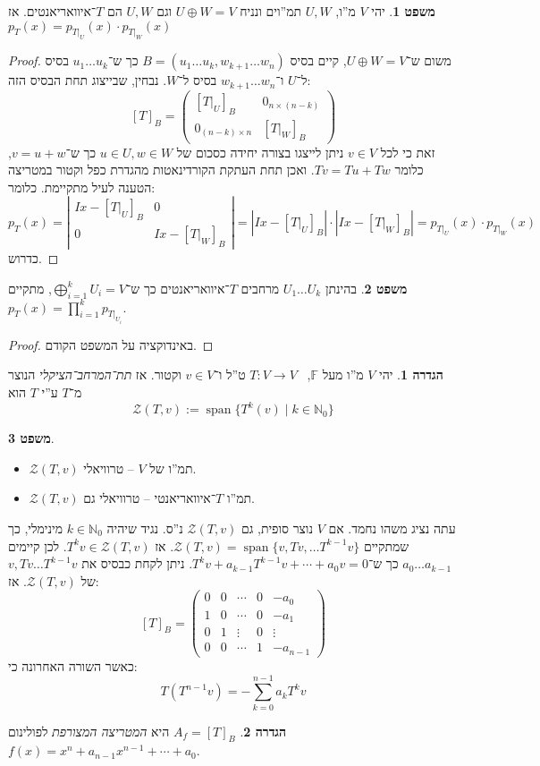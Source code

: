 \documentclass[a4paper]{article}
\newcommand\N     {\mathbb{N}}
\newcommand\zc    {\mathcal{Z}}
\DeclareMathOperator{\Sp}      {span}
\newcommand\F         {\mathbb{F}}
\newcommand\co        {\colon}
\newcommand\pms[1]    {\begin{pmatrix}
		#1
\end{pmatrix}}
\newcommand\detms[1]  {\sof{\begin{matrix}
			#1
\end{matrix}}}
\newcommand\sof[1]    {\left | #1 \right |}
\theoremstyle{definition}
\newtheorem{Theorem}{\color{myblue}משפט}
\newtheorem{Definition}{\color{mygreen}הגדרה}
\newcommand\theo  [1] {\begin{Theorem}#1\end{Theorem}}
\newcommand\defi  [1] {\begin{Definition}#1\end{Definition}}
\begin{document}
	\begin{Theorem}
		יהי $V$ מ''ו, $U, W$ תמ''וים ונניח $U \oplus W = V$ וגם $U, W$ הם $T$־איוואריאנטים. אז $p_T(x) = p_{T|_U}(x) \cdot p_{T|_W}(x)$
	\end{Theorem}
	\begin{proof}
		משום ש־$U \oplus W = V$, קיים בסיס $B = (u_1 \dots u_k, w_{k + 1} \dots w_n)$ כך ש־$u_1 \dots u_k$ בסיס ל־$U$ ו־$w_{k + 1} \dots w_{n}$ בסיס ל־$W$. נבחין, שבייצוג תחת הבסיס הזה: 
		\[ [T]_B = \pms{[T|_U]_B & 0_{n \times (n - k)} \\ 0_{(n - k) \times n} & [T|_W]_B} \]
		זאת כי לכל $v \in V$ ניתן לייצגו בצורה יחידה כסכום של $u \in U, w \in W$ כך ש־$v = u + w$, כלומר $Tv = Tu + Tw$. ואכן תחת העתקת הקורדינאטות מהגדרת כפל וקטור במטריצה הטענה לעיל מתקיימת. 
		כלומר: 
		\[ p_T(x) = \detms{Ix - [T|_U]_B & 0 \\ 0 & Ix - [T|_W]_B} = \sof{Ix - [T|_U]_B} \cdot \sof{Ix - [T|_W]_B} = p_{T|_U}(x) \cdot p_{T|_W}(x) \]
		כדרוש. 
	\end{proof}
	\begin{Theorem}
		בהינתן $U_1 \dots U_k$ מרחבים $T$־איוואריאנטים כך ש־$\bigoplus_{i = 1}^{k} U_i = V$, מתקיים $p_T(x) = \prod_{i = 1}^{k} p_{T|_{U_i}}$. 
	\end{Theorem}
	\begin{proof}
		באינדוקציה על המשפט הקודם. 
	\end{proof}
	
	\defi{יהי $V$ מ''ו מעל $\F$, \ $T \co V \to V$ ט''ל ו־$v \in V$ וקטור. אז \textit{תת־המרחב־הציקלי} הנוצר מ־$T$ ע''י $T$ הוא 
	\[ \mathcal{Z}(T, v) := \Sp\{T^k(v) \mid k \in \N_0\} \]}
	\theo{\,\begin{itemize}
			\item $\zc(T, v)$ תמ''ו של $V$ – טרוויאלי.
			\item $\zc(T, v)$ תמ''ו $T$־איוואריאנטי – טרוויאלי גם. 
	\end{itemize}}
	
	עתה נציג משהו נחמד. אם $V$ נוצר סופית, גם $\zc(T, v)$ נ''ס. נגיד שיהיה $k \in \N_0$ מינימלי, כך שמתקיים $\zc(T, v) = \Sp\{v, Tv, \dots T^{k - 1} v\}$. אז $T^kv \in \zc(T, v)$. לכן קיימים $a_0 \dots a_{k - 1}$ כך ש־$T^kv + a_{k - 1}T^{k - 1}v + \cdots + a_0v = 0$. ניתן לקחת כבסיס את $v, Tv \dots T^{k - 1} v$ של $\zc(T, v)$. אז: 
	\[ [T]_B = \pms{0 & 0 & \cdots & 0 & -a_0
		\\ 1 & 0 & \cdots & 0&-a_1
		\\ 0 & 1 & \vdots & 0& \vdots
		\\ 0 & 0  & \cdots & 1 &-a_{n - 1}} \]
	כאשר השורה האחרונה כי: 
	\[ T(T^{n - 1}v)  = -\sum_{k = 0}^{n - 1}a_kT^kv \]
	\defi{$A_f = [T]_B$ היא \textit{המטריצה המצורפת} לפולינום $f(x) = x^{n} + a_{n - 1}x^{n - 1} + \cdots + a_0$. }
	
\end{document}
